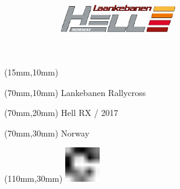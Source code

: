 \null\newpage
\begin{textblock*}{50mm}(15mm,10mm)%
\includegraphics[width=50mm]{LG/HEL.png}
\end{textblock*}
\begin{textblock*}{130mm}(70mm,10mm)%
{\fontsize{20}{20}\selectfont Lankebanen Rallycross}\\
\end{textblock*}
\begin{textblock*}{120mm}(70mm,20mm)%
{\fontsize{16}{16}\selectfont Hell RX / 2017}\\
\end{textblock*}
\begin{textblock*}{120mm}(70mm,30mm)%
{\fontsize{12}{12}\selectfont Norway}
\end{textblock*}
\begin{textblock*}{30mm}(110mm,30mm)%
\centering
\includegraphics[height=15mm]{icons/fa-rotate-right.pdf}
\end{textblock*}
